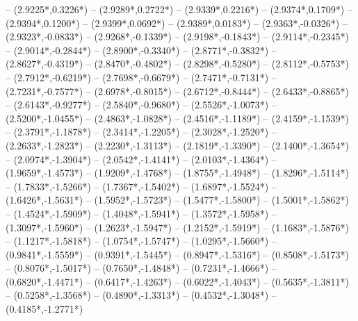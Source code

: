 {	-- ({2.9225*\dx},{0.3226*\dy})
	-- ({2.9289*\dx},{0.2722*\dy})
	-- ({2.9339*\dx},{0.2216*\dy})
	-- ({2.9374*\dx},{0.1709*\dy})
	-- ({2.9394*\dx},{0.1200*\dy})
	-- ({2.9399*\dx},{0.0692*\dy})
	-- ({2.9389*\dx},{0.0183*\dy})
	-- ({2.9363*\dx},{-0.0326*\dy})
	-- ({2.9323*\dx},{-0.0833*\dy})
	-- ({2.9268*\dx},{-0.1339*\dy})
	-- ({2.9198*\dx},{-0.1843*\dy})
	-- ({2.9114*\dx},{-0.2345*\dy})
	-- ({2.9014*\dx},{-0.2844*\dy})
	-- ({2.8900*\dx},{-0.3340*\dy})
	-- ({2.8771*\dx},{-0.3832*\dy})
	-- ({2.8627*\dx},{-0.4319*\dy})
	-- ({2.8470*\dx},{-0.4802*\dy})
	-- ({2.8298*\dx},{-0.5280*\dy})
	-- ({2.8112*\dx},{-0.5753*\dy})
	-- ({2.7912*\dx},{-0.6219*\dy})
	-- ({2.7698*\dx},{-0.6679*\dy})
	-- ({2.7471*\dx},{-0.7131*\dy})
	-- ({2.7231*\dx},{-0.7577*\dy})
	-- ({2.6978*\dx},{-0.8015*\dy})
	-- ({2.6712*\dx},{-0.8444*\dy})
	-- ({2.6433*\dx},{-0.8865*\dy})
	-- ({2.6143*\dx},{-0.9277*\dy})
	-- ({2.5840*\dx},{-0.9680*\dy})
	-- ({2.5526*\dx},{-1.0073*\dy})
	-- ({2.5200*\dx},{-1.0455*\dy})
	-- ({2.4863*\dx},{-1.0828*\dy})
	-- ({2.4516*\dx},{-1.1189*\dy})
	-- ({2.4159*\dx},{-1.1539*\dy})
	-- ({2.3791*\dx},{-1.1878*\dy})
	-- ({2.3414*\dx},{-1.2205*\dy})
	-- ({2.3028*\dx},{-1.2520*\dy})
	-- ({2.2633*\dx},{-1.2823*\dy})
	-- ({2.2230*\dx},{-1.3113*\dy})
	-- ({2.1819*\dx},{-1.3390*\dy})
	-- ({2.1400*\dx},{-1.3654*\dy})
	-- ({2.0974*\dx},{-1.3904*\dy})
	-- ({2.0542*\dx},{-1.4141*\dy})
	-- ({2.0103*\dx},{-1.4364*\dy})
	-- ({1.9659*\dx},{-1.4573*\dy})
	-- ({1.9209*\dx},{-1.4768*\dy})
	-- ({1.8755*\dx},{-1.4948*\dy})
	-- ({1.8296*\dx},{-1.5114*\dy})
	-- ({1.7833*\dx},{-1.5266*\dy})
	-- ({1.7367*\dx},{-1.5402*\dy})
	-- ({1.6897*\dx},{-1.5524*\dy})
	-- ({1.6426*\dx},{-1.5631*\dy})
	-- ({1.5952*\dx},{-1.5723*\dy})
	-- ({1.5477*\dx},{-1.5800*\dy})
	-- ({1.5001*\dx},{-1.5862*\dy})
	-- ({1.4524*\dx},{-1.5909*\dy})
	-- ({1.4048*\dx},{-1.5941*\dy})
	-- ({1.3572*\dx},{-1.5958*\dy})
	-- ({1.3097*\dx},{-1.5960*\dy})
	-- ({1.2623*\dx},{-1.5947*\dy})
	-- ({1.2152*\dx},{-1.5919*\dy})
	-- ({1.1683*\dx},{-1.5876*\dy})
	-- ({1.1217*\dx},{-1.5818*\dy})
	-- ({1.0754*\dx},{-1.5747*\dy})
	-- ({1.0295*\dx},{-1.5660*\dy})
	-- ({0.9841*\dx},{-1.5559*\dy})
	-- ({0.9391*\dx},{-1.5445*\dy})
	-- ({0.8947*\dx},{-1.5316*\dy})
	-- ({0.8508*\dx},{-1.5173*\dy})
	-- ({0.8076*\dx},{-1.5017*\dy})
	-- ({0.7650*\dx},{-1.4848*\dy})
	-- ({0.7231*\dx},{-1.4666*\dy})
	-- ({0.6820*\dx},{-1.4471*\dy})
	-- ({0.6417*\dx},{-1.4263*\dy})
	-- ({0.6022*\dx},{-1.4043*\dy})
	-- ({0.5635*\dx},{-1.3811*\dy})
	-- ({0.5258*\dx},{-1.3568*\dy})
	-- ({0.4890*\dx},{-1.3313*\dy})
	-- ({0.4532*\dx},{-1.3048*\dy})
	-- ({0.4185*\dx},{-1.2771*\dy})
}
